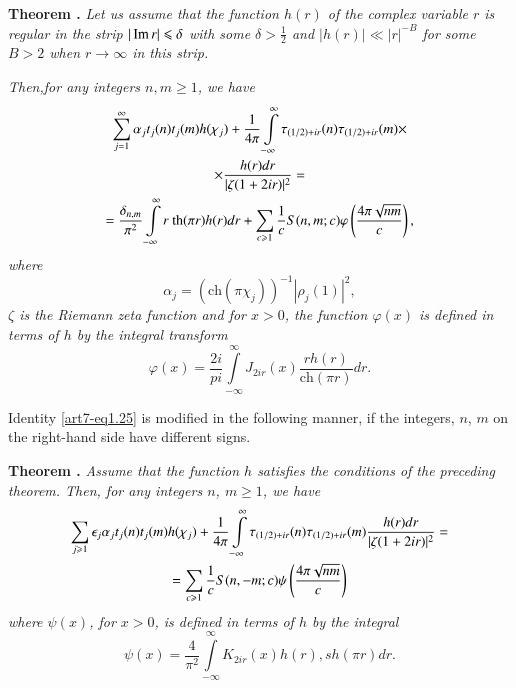 \medskip
\noindent
{\bfseries Theorem .\label{art7-thm1}} \textit{Let us assume that the function $h(r)$ of the complex variable $r$ is regular in the strip $|\operatorname{Im} r| \leqslant \delta$ with some $\delta > \frac{1}{2}$ and $|h(r)| \ll |r|^{-B}$ for some $B > 2$ when $r \to\infty$ in this strip.}


\textit{Then,\pageoriginale for any integers $n, m \geqslant 1$, we have}
\begin{gather}
\sum\limits^\infty_{j=1} \alpha_j t_j (n) t_j (m) h (\chi_j) + \frac{1}{4\pi} \int\limits^\infty_{-\infty} \tau_{(1/2) + ir} (n) \tau_{(1/2) + ir} (m) \times 
\label{art7-eq1.25} \\
\times \frac{h(r)dr}{|\zeta (1+2ir)|^2} = \notag\\
= \frac{\delta_{n,m}}{\pi^2} \int\limits^\infty_{-\infty} r \text{ th}(\pi r) h (r) dr + \sum\limits_{c \geqslant 1} \frac{1}{c} S (n, m; c) \varphi \left(\frac{4\pi \sqrt{nm}}{c} \right) , \notag
\end{gather}
\textit{where }
\begin{equation}
\alpha_j = (\text{ch} (\pi \chi_j))^{-1} |\rho_j (1)|^2,  \label{art7-eq1.26}
\end{equation}
\textit{$\zeta$ is the Riemann zeta function and for $x > 0$, the function $\varphi(x)$ is defined in terms of $h$ by the integral transform}
\begin{equation}
\varphi (x) = \frac{2i}{pi} \int\limits^{\infty}_{-\infty} J_{2 ir} (x) \frac{rh(r)}{\text{ch} (\pi r)} dr. \label{art7-eq1.27}
\end{equation}

Identity \eqref{art7-eq1.25} is modified in the following manner, if the integers, $n$, $m$ on the right-hand side have different signs.

\medskip
\noindent
{\bfseries Theorem .\label{art7-thm2}} \textit{Assume that the function $h$ satisfies the conditions of the preceding theorem. Then, for any integers $n$, $m \geqslant 1$, we have}
\begin{gather}
\sum\limits_{j \geqslant 1} \epsilon_j \alpha_j t_j (n) t_j (m) h (\chi_j) + \frac{1}{4\pi} \int\limits^\infty_{-\infty} \tau_{(1/2)+ ir} (n) \tau_{(1/2) + ir} (m) \frac{h(r)dr}{|\zeta (1+2ir)|^2} = \label{art7-eq1.28}\\
= \sum\limits_{c \geqslant 1} \frac{1}{c} S (n, -m; c) \psi \left(\frac{4\pi \sqrt{nm}}{c} \right) \notag
\end{gather}
\textit{where $\psi (x)$, for $x>0$, is defined in terms of $h$ by the integral}
\begin{equation}
\psi(x) = \frac{4}{\pi^2} \int\limits^\infty_{-\infty} K_{2ir} (x) h (r), sh (\pi r) dr.  \label{art7-eq1.29}
\end{equation}

